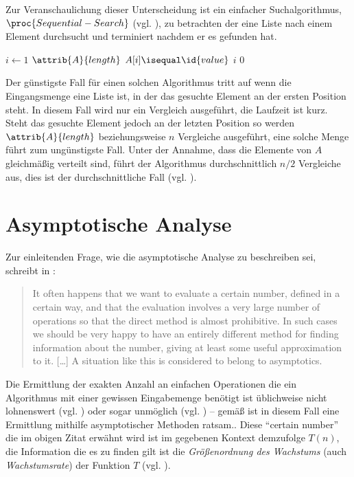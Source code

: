 Zur Veranschaulichung dieser Unterscheidung ist ein einfacher Suchalgorithmus, $\proc{Sequential-Search}$ (vgl. \cite[396]{taocp3}), zu betrachten der eine Liste nach einem Element durchsucht und terminiert nachdem er es gefunden hat.

\begin{codebox}
    \li \For $i \gets 1$ \To $\attrib{A}{length}$
    \li     \Do
                \If $A[i] \isequal \id{value}$
    \li             \Then
                        \Return $i$
                    \End
            \End
    \li \Return $0$
\end{codebox}

Der günstigste Fall für einen solchen Algorithmus tritt auf wenn die Eingangsmenge eine Liste ist, in der das gesuchte Element an der ersten Position steht. In diesem Fall wird nur ein Vergleich ausgeführt, die Laufzeit ist kurz. Steht das gesuchte Element jedoch an der letzten Position so werden $\attrib{A}{length}$ beziehungsweise $n$ Vergleiche ausgeführt, eine solche Menge führt zum ungünstigste Fall. Unter der Annahme, dass die Elemente von $A$ gleichmäßig verteilt sind, führt der Algorithmus durchschnittlich $n/2$ Vergleiche aus, dies ist der durchschnittliche Fall (vgl. \cite[59]{sha2011}).

\section{Asymptotische Analyse}
\label{sec:asymptotic-analysis}

Zur einleitenden Frage, wie die asymptotische Analyse zu beschreiben sei, schreibt \citeauthor{bru1958} in :

\blockquote[{\cite[1]{bru1958}}]{It often happens that we want to evaluate a certain number, defined in a certain way, and that the evaluation involves a very large number of operations so that the direct method is almost prohibitive. In such cases we should be very happy to have an entirely different method for finding information about the number, giving at least some useful approximation to it. [\ldots] A situation like this is considered to belong to asymptotics.}

Die Ermittlung der exakten Anzahl an einfachen Operationen die ein Algorithmus mit einer gewissen Eingabemenge benötigt ist üblichweise nicht lohnenswert (vgl. \cite[28]{hsr1997}) oder sogar unmöglich (vgl. \cite[37]{meh1984}) -- gemäß \citeauthor{bru1958} ist in diesem Fall eine Ermittlung mithilfe asymptotischer Methoden ratsam.. Diese \enquote{certain number} die im obigen Zitat erwähnt wird ist im gegebenen Kontext demzufolge $T(n)$, die Information die es zu finden gilt ist die \emph{Größenordnung des Wachstums} (auch \emph{Wachstumsrate}) der Funktion $T$ (vgl. \cite[63]{sha2011}).

